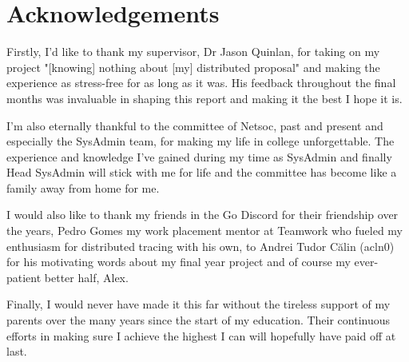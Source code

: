 \documentclass[12pt,pdftex,titlepage]{report}
\begin{document}
    \chapter*{Acknowledgements}
        \begin{spacing}{1.0}
            Firstly, I'd like to thank my supervisor, Dr Jason Quinlan, for taking on my project "[knowing] nothing about [my] distributed proposal" and making
            the experience as stress-free for as long as it was. His feedback throughout the final months was invaluable in shaping this report and making it
            the best I hope it is.

            I'm also eternally thankful to the committee of Netsoc, past and present and especially the SysAdmin team, for making my life in college unforgettable.
            The experience and knowledge I've gained during my time as SysAdmin and finally Head SysAdmin will stick with me for life and the committee has become
            like a family away from home for me.

            I would also like to thank my friends in the Go Discord for their friendship over the years, Pedro Gomes my work placement mentor at Teamwork who
            fueled my enthusiasm for distributed tracing with his own, to Andrei Tudor Călin (acln0) for his motivating words about my final year project and 
            of course my ever-patient better half, Alex.

            Finally, I would never have made it this far without the tireless support of my parents over the many years since the start of my education.
            Their continuous efforts in making sure I achieve the highest I can will hopefully have paid off at last.
        \end{spacing}
        
    \begin{spacing}{0.98}
        \tableofcontents
    \end{spacing}

    \begin{spacing}{1.0}
        \listoffigures
    \end{spacing}

    \begin{spacing}{1.0}
        \lstlistoflistings
    \end{spacing}
\end{document}
